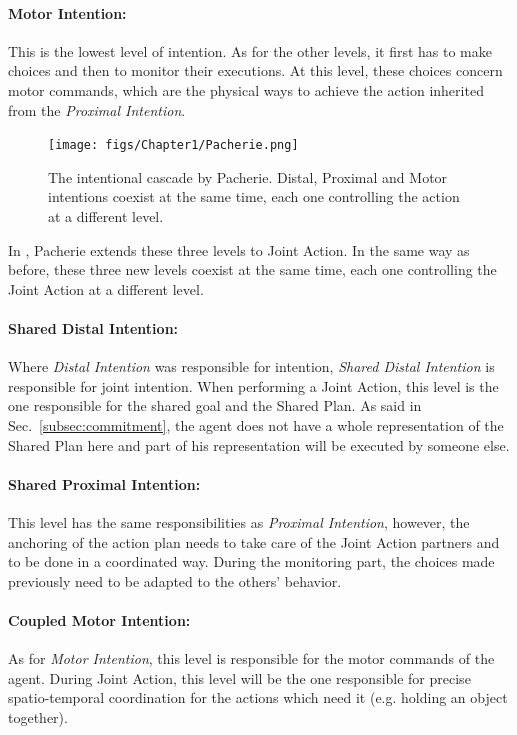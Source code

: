 \documentclass[english,a4paper,11pt,twoside]{StyleThese}
\begin{document}
\paragraph{Motor Intention:}
This is the lowest level of intention. As for the other levels, it first has to make choices and then to monitor their executions. At this level, these choices concern motor commands, which are the physical ways to achieve the action inherited from the \textit{Proximal Intention}.


\begin{figure}[!h]
	\centering
    \texttt{[image: figs/Chapter1/Pacherie.png]}
    \caption{The intentional cascade by Pacherie. Distal, Proximal and Motor intentions coexist at the same time, each one controlling the action at a different level.}
    \label{fig:Pacherie}
\end{figure}

In \cite{pacherie2011phenomenology}, Pacherie extends these three levels to Joint Action. In the same way as before, these three new levels coexist at the same time, each one controlling the Joint Action at a different level.

\paragraph{Shared Distal Intention:}
Where \textit{Distal Intention} was responsible for intention, \textit{Shared Distal Intention} is responsible for joint intention. When performing a Joint Action, this level is the one responsible for the shared goal and the Shared Plan. As said in Sec.~\ref{subsec:commitment}, the agent does not have a whole representation of the Shared Plan here and part of his representation will be executed by someone else.

\paragraph{Shared Proximal Intention:}
This level has the same responsibilities as \textit{Proximal Intention}, however, the anchoring of the action plan needs to take care of the Joint Action partners and to be done in a coordinated way. During the monitoring part, the choices made previously need to be adapted to the others' behavior.

\paragraph{Coupled Motor Intention:}
As for \textit{Motor Intention}, this level is responsible for the motor commands of the agent. During Joint Action, this level will be the one responsible for precise spatio-temporal coordination for the actions which need it (e.g. holding an object together).
\end{document}
